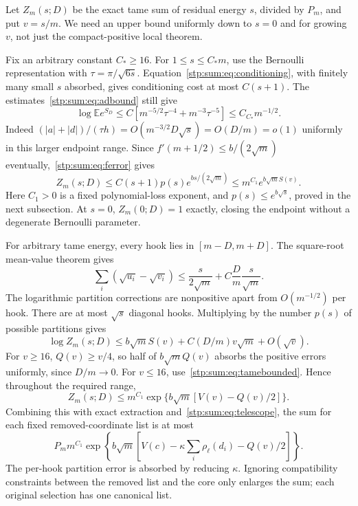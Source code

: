 \documentclass[11pt]{article}
\theoremstyle{remark}\newtheorem{remark}[theorem]{Remark}
\newcommand{\E}{\mathbb E}
\begin{document}
Let $Z_m(s;D)$ be the exact tame sum of residual energy $s$, divided by $P_m$, and put $v=s/m$. We need an upper bound uniformly down to $s=0$ and for growing $v$, not just the compact-positive local theorem.

Fix an arbitrary constant $C_*\ge16$. For $1\le s\le C_*m$, use the Bernoulli representation with $\tau=\pi/\sqrt{6s}$. Equation~\eqref{stp:sum:eq:conditioning}, with finitely many small $s$ absorbed, gives conditioning cost at most $C(s+1)$. The estimates~\eqref{stp:sum:eq:adbound} still give
\[
 \log\E e^{S_D}
 \le C[m^{-5/2}\tau^{-4}+m^{-3}\tau^{-5}]
 \le C_{C_*}m^{-1/2}.
\]
Indeed $(|a|+|d|)/(\tau h)=O(m^{-3/2}D\sqrt s)=O(D/m)=o(1)$ uniformly in this larger endpoint range. Since $f'(m+1/2)\le b/(2\sqrt m)$ eventually,~\eqref{stp:sum:eq:ferror} gives
\begin{equation}\label{stp:sum:eq:tamebounded}
 Z_m(s;D)\le C(s+1)p(s)e^{bs/(2\sqrt m)}
 \le m^{C_1} e^{b\sqrt mS(v)}.
\end{equation}
Here $C_1>0$ is a fixed polynomial-loss exponent, and $p(s)\le e^{b\sqrt s}$, proved in the next subsection. At $s=0$, $Z_m(0;D)=1$ exactly, closing the endpoint without a degenerate Bernoulli parameter.

For arbitrary tame energy, every hook lies in $[m-D,m+D]$. The square-root mean-value theorem gives
\[
 \sum_i(\sqrt{u_i}-\sqrt{v_i})
 \le\frac{s}{2\sqrt m}+C\frac Dm\frac s{\sqrt m}.
\]
The logarithmic partition corrections are nonpositive apart from $O(m^{-1/2})$ per hook. There are at most $\sqrt s$ diagonal hooks. Multiplying by the number $p(s)$ of possible partitions gives
\begin{equation}\label{stp:sum:eq:tamegrowing}
 \log Z_m(s;D)\le b\sqrt mS(v)+C(D/m)v\sqrt m+O(\sqrt v).
\end{equation}
For $v\ge16$, $Q(v)\ge v/4$, so half of $b\sqrt mQ(v)$ absorbs the positive errors uniformly, since $D/m\to0$. For $v\le16$, use~\eqref{stp:sum:eq:tamebounded}. Hence throughout the required range,
\begin{equation}\label{stp:sum:eq:tameuniform}
 Z_m(s;D)\le m^{C_1}\exp\{b\sqrt m[V(v)-Q(v)/2]\}.
\end{equation}
Combining this with exact extraction and~\eqref{stp:sum:eq:telescope}, the sum for each fixed removed-coordinate list is at most
\begin{equation}\label{stp:sum:eq:listbound}
 P_mm^{C_1}\exp\left\{b\sqrt m\left[V(c)
       -\kappa\sum_i\rho_\ell(d_i)-Q(v)/2\right]\right\}.
\end{equation}
The per-hook partition error is absorbed by reducing $\kappa$. Ignoring compatibility constraints between the removed list and the core only enlarges the sum; each original selection has one canonical list.
\end{document}
